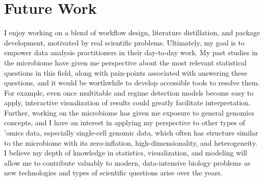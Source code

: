 \documentclass{article}
\begin{document}
\section{Future Work}

I enjoy working on a blend of workflow design, literature distillation, and
package development, motivated by real scientific problems. Ultimately, my goal
is to empower data analysis practitioners in their day-to-day work. My past
studies in the microbiome have given me perspective about the most relevant
statistical questions in this field, along with pain-points associated with
answering these questions, and it would be worthwhile to develop accessible
tools to resolve them. For example, even once multitable and regime detection
models become easy to apply, interactive visualization of results could greatly
facilitate interpretation. Further, working on the microbiome has given me
exposure to general genomics concepts, and I have an interest in applying my
perspective to other types of 'omics data, especially single-cell genomic data,
which often has structure similar to the microbiome with its zero-inflation,
high-dimensionality, and heterogeneity. I believe my depth of knowledge in
statistics, visualization, and modeling will allow me to contribute valuably to
modern, data-intensive biology problems as new technologies and types of
scientific questions arise over the years.



\end{document}
